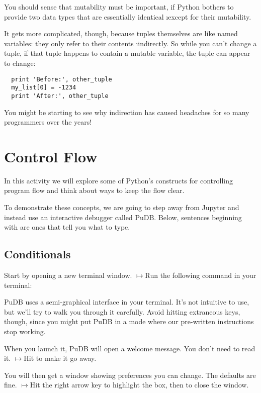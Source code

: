\documentclass[letterpaper, 12pt, titlepage, twoside]{article}
\begin{document}
You should sense that mutability must be important, if Python bothers to
provide two data types that are essentially identical \i{except} for their
mutability.

It gets more complicated, though, because tuples themselves are like named
variables: they only refer to their contents \i{indirectly}. So while you
can't change a tuple, if that tuple happens to contain a mutable variable, the
tuple can appear to change:

\begin{lstlisting}
  print 'Before:', other_tuple
  my_list[0] = -1234
  print 'After:', other_tuple
\end{lstlisting}

You might be starting to see why indirection has caused headaches for so many
programmers over the years!


\newpage
\section{Control Flow}

\def\typeit{$\pmb\mapsto$\space}

In this activity we will explore some of Python's constructs for controlling
program flow and think about ways to keep the flow clear.

To demonstrate these concepts, we are going to step away from Jupyter and
instead use an interactive debugger called PuDB. Below, sentences beginning
with \fbox{\typeit} are ones that tell you what to type.

\subsection*{Conditionals}

Start by opening a new terminal window. \typeit Run the following command in
your terminal:


PuDB uses a semi-graphical interface in your terminal. It's not intuitive to
use, but we'll try to walk you through it carefully. Avoid hitting extraneous
keys, though, since you might put PuDB in a mode where our pre-written
instructions stop working.

When you launch it, PuDB will open a welcome message. You don't need to read
it. \typeit Hit  to make it go away.

You will then get a window showing preferences you can change. The defaults
are fine. \typeit Hit the right arrow key to highlight the  box, then
 to close the window.
\end{document}
